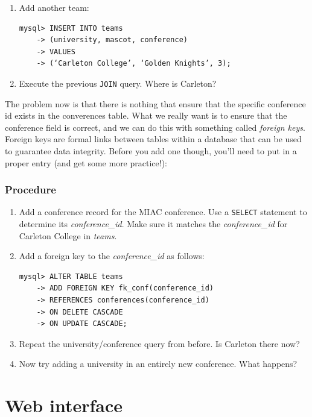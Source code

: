 \documentclass[11pt]{article} %
\begin{document}
\begin{enumerate}
\item Add another team:

\begin{verbatim}
mysql> INSERT INTO teams
    -> (university, mascot, conference)
    -> VALUES
    -> (‘Carleton College’, ‘Golden Knights’, 3);
\end{verbatim}

\item Execute the previous \verb|JOIN| query. Where is Carleton?
\end{enumerate}

The problem now is that there is nothing that ensure that the specific conference id exists in the converences table. What we really want is to ensure that the conference field is correct, and we can do this with something called \emph{foreign keys}. Foreign keys are formal links between tables within a database that can be used to guarantee data integrity. Before you add one though, you’ll need to put in a proper entry (and get some more practice!):

\subsubsection*{Procedure}

\begin{enumerate}
\item Add a conference record for the MIAC conference. Use a \verb|SELECT| statement to determine its \emph{conference\_id}. Make sure it matches the \emph{conference\_id} for Carleton College in \emph{teams}.
\item Add a foreign key to the \emph{conference\_id} as follows:

\begin{verbatim}
mysql> ALTER TABLE teams
    -> ADD FOREIGN KEY fk_conf(conference_id)
    -> REFERENCES conferences(conference_id)
    -> ON DELETE CASCADE
    -> ON UPDATE CASCADE;
\end{verbatim}

\item Repeat the university/conference query from before. Is Carleton there now?
\item Now try adding a university in an entirely new conference. What happens?
\end{enumerate}

\section{Web interface}
\end{document}
